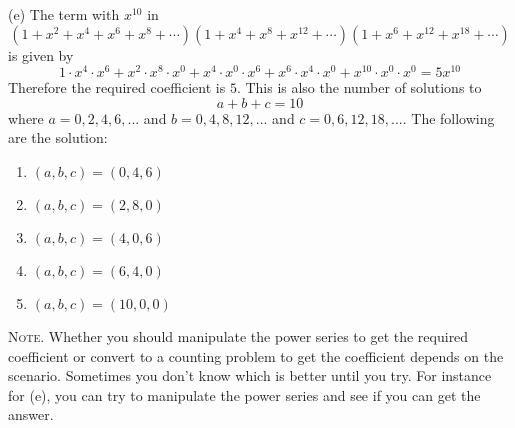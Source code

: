(e)
The term with $x^{10}$ in
\[
(1+x^2+x^4+x^6+x^8+ \cdots)(1+x^4+x^8+x^{12} + \cdots)(1 +
x^6 + x^{12} + x^{18} + \cdots)
\]
is given by
\[
1 \cdot x^4 \cdot x^6 + x^2 \cdot x^8 \cdot x^0 + x^4 \cdot x^0 \cdot x^6
+ x^6 \cdot x^4 \cdot x^0 + x^{10} \cdot x^0 \cdot x^0 = 5x^{10}
\]
Therefore the required coefficient is $5$.
This is also the number of solutions to
\[
a + b + c = 10
\]
where $a=0,2,4,6,...$ and $b=0,4,8,12,...$ and $c = 0,6,12,18,...$.
The following are the solution:
\begin{enumerate}[nosep]
\item $(a,b,c) = (0,4,6)$
\item $(a,b,c) = (2,8,0)$
\item $(a,b,c) = (4,0,6)$
\item $(a,b,c) = (6,4,0)$
\item $(a,b,c) = (10,0,0)$
\end{enumerate}

\textsc{Note.}
Whether you should manipulate the power series to get the
required coefficient or convert to a counting problem to get the
coefficient depends on the scenario.
Sometimes you don't know which is better until you try.
For instance for (e), you can try to manipulate the power series
and see if you can get the answer.
